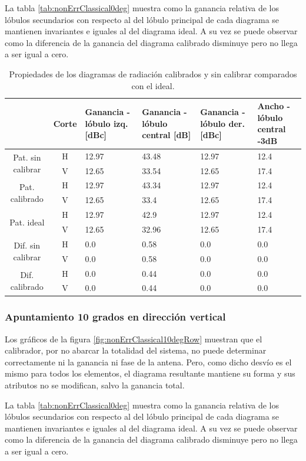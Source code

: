 La tabla \ref{tab:nonErrClassical0deg} muestra como la ganancia relativa de los lóbulos secundarios con respecto al del lóbulo
principal de cada diagrama se mantienen invariantes e iguales al del diagrama ideal. A su vez se puede observar como la diferencia
de la ganancia del diagrama calibrado disminuye pero no llega a ser igual a cero.
\begin{table}[H]
  \footnotesize
  \centering
  \begin{tabular}{|c|c|p{2cm}|p{2.5cm}|p{2.5cm}|p{2.5cm}|}
    \cline{2-6}
    \multicolumn{1}{c|}{} & Corte & Ganancia - lóbulo izq. [dBc] & Ganancia - lóbulo central [dB] &
    Ganancia - lóbulo der. [dBc] & Ancho - lóbulo central -3dB \tabularnewline\hline
    \multirow{2}{2cm}{Pat. sin calibrar} & H & 12.97 & 43.48 & 12.97 & 12.4 \tabularnewline\cline{2-6}
     & V & 12.65 & 33.54 & 12.65 & 17.4 \tabularnewline\hline
    \multirow{2}{2cm}{Pat. calibrado} & H & 12.97 & 43.34 & 12.97 & 12.4 \tabularnewline\cline{2-6}
     & V & 12.65 & 33.4 & 12.65 & 17.4 \tabularnewline\hline
    \multirow{2}{2cm}{Pat. ideal} & H & 12.97 & 42.9 & 12.97 & 12.4 \tabularnewline\cline{2-6}
     & V & 12.65 & 32.96 & 12.65 & 17.4 \tabularnewline\hline
    \multirow{2}{2cm}{Dif. sin calibrar} & H & 0.0 & 0.58 & 0.0 & 0.0\tabularnewline\cline{2-6}
     & V & 0.0 & 0.58 & 0.0 & 0.0 \tabularnewline\hline
    \multirow{2}{2cm}{Dif. calibrado} & H & 0.0 & 0.44 & 0.0 & 0.0 \tabularnewline\cline{2-6}
     & V & 0.0 & 0.44 & 0.0 & 0.0 \tabularnewline\hline
  \end{tabular}
  \caption{Propiedades de los diagramas de radiación calibrados y sin calibrar comparados con el ideal.}
  \label{tab:nonErrClassical10degCol}
\end{table}


\subsubsection{Apuntamiento 10 grados en dirección vertical}

Los gráficos de la figura \ref{fig:nonErrClassical10degRow} muestran que el calibrador, por no abarcar la totalidad del sistema,
no puede determinar correctamente ni la ganancia ni fase de la antena. Pero, como dicho desvío es el mismo para todos los elementos,
el diagrama resultante mantiene su forma y sus atributos no se modifican, salvo la ganancia total.

La tabla \ref{tab:nonErrClassical0deg} muestra como la ganancia relativa de los lóbulos secundarios con respecto al del lóbulo
principal de cada diagrama se mantienen invariantes e iguales al del diagrama ideal. A su vez se puede observar como la diferencia
de la ganancia del diagrama calibrado disminuye pero no llega a ser igual a cero.

